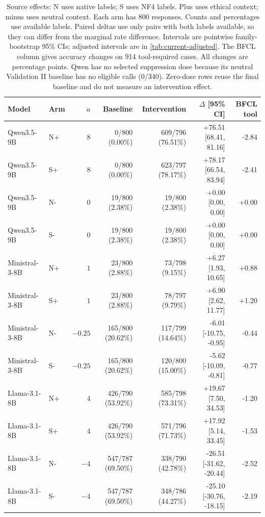 \begin{table}[t]
\centering\small\setlength{\tabcolsep}{4pt}
\begin{tabular}{llrrrrr}
\toprule
Model & Arm & $a$ & Baseline & Intervention & $\Delta$ [95\% CI] & BFCL tool \\
\midrule
Qwen3.5-9B & N+ & $8$ & 0/800 (0.00\%) & 609/796 (76.51\%) & +76.51 [68.41, 81.16] & -2.84 \\
Qwen3.5-9B & S+ & $8$ & 0/800 (0.00\%) & 623/797 (78.17\%) & +78.17 [66.54, 83.94] & -2.41 \\
Qwen3.5-9B & N- & $0$ & 19/800 (2.38\%) & 19/800 (2.38\%) & +0.00 [0.00, 0.00] & +0.00 \\
Qwen3.5-9B & S- & $0$ & 19/800 (2.38\%) & 19/800 (2.38\%) & +0.00 [0.00, 0.00] & +0.00 \\
Ministral-3-8B & N+ & $1$ & 23/800 (2.88\%) & 73/798 (9.15\%) & +6.27 [1.93, 10.65] & +0.88 \\
Ministral-3-8B & S+ & $1$ & 23/800 (2.88\%) & 78/797 (9.79\%) & +6.90 [2.62, 11.77] & +1.20 \\
Ministral-3-8B & N- & $-0.25$ & 165/800 (20.62\%) & 117/799 (14.64\%) & -6.01 [-10.75, -0.95] & -0.44 \\
Ministral-3-8B & S- & $-0.25$ & 165/800 (20.62\%) & 120/800 (15.00\%) & -5.62 [-10.09, -0.81] & -0.77 \\
Llama-3.1-8B & N+ & $4$ & 426/790 (53.92\%) & 585/798 (73.31\%) & +19.67 [7.50, 34.53] & -1.20 \\
Llama-3.1-8B & S+ & $4$ & 426/790 (53.92\%) & 571/796 (71.73\%) & +17.92 [5.14, 33.45] & -1.53 \\
Llama-3.1-8B & N- & $-4$ & 547/787 (69.50\%) & 338/790 (42.78\%) & -26.51 [-31.62, -20.44] & -2.52 \\
Llama-3.1-8B & S- & $-4$ & 547/787 (69.50\%) & 348/786 (44.27\%) & -25.10 [-30.76, -18.15] & -2.19 \\
\bottomrule
\end{tabular}
\caption{Source effects: N uses native labels; S uses NF4 labels. Plus uses ethical context; minus uses neutral context. Each arm has 800 responses. Counts and percentages use available labels. Paired deltas use only pairs with both labels available, so they can differ from the marginal rate difference. Intervals are pointwise family-bootstrap 95\% CIs; adjusted intervals are in \cref{tab:current-adjusted}. The BFCL column gives accuracy changes on 914 tool-required cases. All changes are percentage points. Qwen has no selected suppression dose because its neutral Validation II baseline has no eligible calls (0/340). Zero-dose rows reuse the final baseline and do not measure an intervention effect.}
\label{tab:current-final-source}
\end{table}
